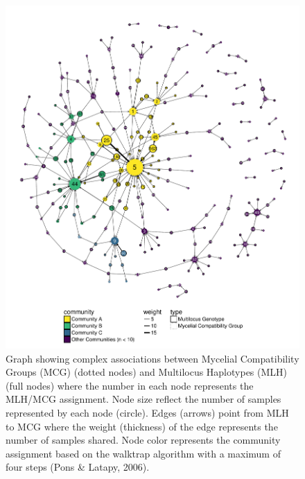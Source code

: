 \documentclass[fleqn,10pt,lineno]{wlpeerj} %
\theoremstyle{definition}
\theoremstyle{definition}
\theoremstyle{definition}
\theoremstyle{remark}
\begin{document}
\begin{figure}
\centering
\includegraphics[width=1.00000\textwidth]{../../results/figures/publication/full-graph.pdf}
\caption{Graph showing complex associations between Mycelial
Compatibility Groups (MCG) (dotted nodes) and Multilocus Haplotypes
(MLH) (full nodes) where the number in each node represents the MLH/MCG
assignment. Node size reflect the number of samples represented by each
node (circle). Edges (arrows) point from MLH to MCG where the weight
(thickness) of the edge represents the number of samples shared. Node
color represents the community assignment based on the walktrap
algorithm with a maximum of four steps (Pons \& Latapy,
2006).}\label{fullgraph}
\end{figure}
\end{document}
